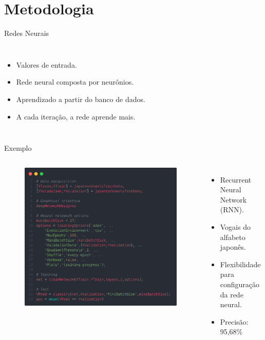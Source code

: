 \section{Metodologia}

\begin{frame}{Redes Neurais}
%
\begin{columns}
%
\begin{itemize}
    \item Valores de entrada.
    \item Rede neural composta por neurônios.
    \item Aprendizado a partir do banco de dados.
    \item A cada iteração, \alert{a rede aprende mais}.
\end{itemize}
%
\begin{figure}
    \centering
    
\end{figure}
\end{columns}
\end{frame}

\begin{frame}{Exemplo}
\begin{columns}
\begin{figure}
    \centering
    \includegraphics[width=\columnwidth]{figures/nn_code.png}
\end{figure}
\begin{itemize}
    \item Recurrent Neural Network (RNN).
    \item Vogais do alfabeto japonês.
    \item Flexibilidade para configuração da rede neural.
    \item Precisão: 95,68\%
\end{itemize}
\end{columns}
\end{frame}